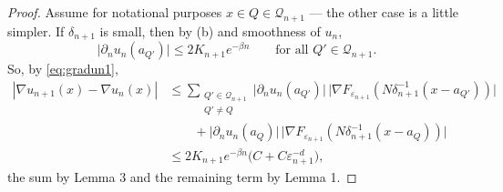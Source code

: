 \documentclass[11pt,reqno]{amsart}
\theoremstyle{plain}
\theoremstyle{definition}
\theoremstyle{plain}
\theoremstyle{definition}
\theoremstyle{remark}
\newcommand{\nd}{\partial_n}
\begin{document}
\begin{proof}
Assume for notational purposes $x\in Q\in\mathcal Q_{n+1}$ --- the other case is a
little simpler. If $\delta_{n+1}$ is small, then by (b) and smoothness of $u_n$,
\begin{equation}\label{eq:ptwise}
 \bigl|\nd u_n(a_{Q'})\bigr|\le2K_{n+1}e^{-\beta n}
 \qquad\text{for all }Q'\in\mathcal Q_{n+1}.
\end{equation}
So, by \eqref{eq:gradun1},
\begin{align*}
 |\nabla u_{n+1}(x)-\nabla u_n(x)|
 &\le\sum_{\substack{Q'\in\mathcal Q_{n+1}\\Q'\ne Q}}
   \bigl|\nd u_n(a_{Q'})\bigr|\,
   \bigl|\nabla F_{\varepsilon_{n+1}}(N\delta_{n+1}^{-1}(x-a_{Q'}))\bigr|\\
 &\qquad+\bigl|\nd u_n(a_{Q})\bigr|\,
   \bigl|\nabla F_{\varepsilon_{n+1}}(N\delta_{n+1}^{-1}(x-a_{Q}))\bigr|\\
 &\le2K_{n+1}e^{-\beta n}\bigl(C+C\varepsilon_{n+1}^{-d}\bigr),
\end{align*}
the sum by Lemma 3 and the remaining term by Lemma 1.
\end{proof}
\end{document}

